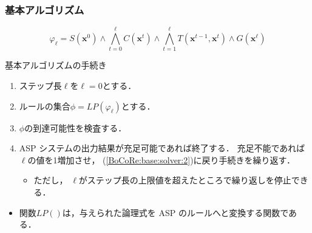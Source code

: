 \documentclass[dvipdfmx,11pt]{beamer}
\begin{document}
\begin{frame}
  \frametitle{基本アルゴリズム}

  \[
    \varphi_{\ell} = S(\bm{x}^0)  
    \land \bigwedge_{t=0}^{\ell} C(\bm{x}^t) 
    \land \bigwedge_{t=1}^{\ell} T(\bm{x}^{t-1},\bm{x}^{t}) 
    \land G(\bm{x}^\ell)  
  \]

\begin{block}{基本アルゴリズムの手続き}
\begin{enumerate}
\item ステップ長$\ell$を$\ell=0$とする．
\item \label{BoCoRe:base:solver:2}
  ルールの集合$\phi = LP(\varphi_\ell)$とする．
\item $\phi$の到達可能性を検査する．
\item ASP システムの出力結果が充足可能であれば終了する．
  充足不能であれば$\ell$の値を1増加させ，
  (\ref{BoCoRe:base:solver:2})に戻り手続きを繰り返す．
  \begin{itemize}
    \item ただし，
      $\ell$がステップ長の上限値を超えたところで繰り返しを停止できる．
  \end{itemize}
\end{enumerate}
\end{block}

\begin{itemize}
\item 関数$LP()$は，与えられた論理式を ASP のルールへと変換する関数である．
\end{itemize}
\end{frame}
\end{document}
